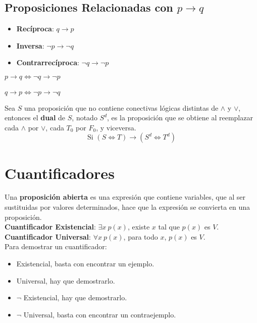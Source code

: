 \documentclass[11pt,a4paper]{article}
\begin{document}
\subsection{Proposiciones Relacionadas con $p \rightarrow q$}
\begin{multicols}{2}
\begin{itemize}
\item \textbf{Rec\'iproca}: $q \rightarrow p$
\item \textbf{Inversa}: $\lnot p \rightarrow \lnot q$
\item \textbf{Contrarrecíproca}: $\lnot q \rightarrow \lnot p$
\end{itemize}

\noindent $p \rightarrow q \Leftrightarrow \lnot q \rightarrow \lnot p$\\ \\
\noindent $q \rightarrow p \Leftrightarrow \lnot p \rightarrow \lnot q$\\
\end{multicols}

\noindent Sea $S$ una proposici\'on que no contiene conectivas l\'ogicas distintas de $\land$ y $\lor$, entonces el \textbf{dual} de $S$, notado $S^d$, es la proposici\'on que se obtiene al reemplazar cada $\land$ por $\lor$, cada $T_0$ por $F_0$, y viceversa.
$$\text{Si } (S \Leftrightarrow T) \rightarrow (S^d \Leftrightarrow T^d)$$

\section{Cuantificadores}
\noindent Una \textbf{proposición abierta} es una expresi\'on que contiene variables, que al ser sustituidas por valores determinados, hace que la expresión se convierta en una proposición.\\

\noindent \textbf{Cuantificador Existencial}: $\exists x\ p(x)$, existe $x$ tal que $p(x)$ es $V$.\\
\noindent \textbf{Cuantificador Universal}: $\forall x\ p(x)$, para todo $x$, $p(x)$ es $V$.\\

Para demostrar un cuantificador:
\begin{itemize}
\item Existencial, basta con encontrar un ejemplo.
\item Universal, hay que demostrarlo.
\item $\lnot$ Existencial, hay que demostrarlo.
\item $\lnot$ Universal, basta con encontrar un contraejemplo.
\end{itemize}
\end{document}
